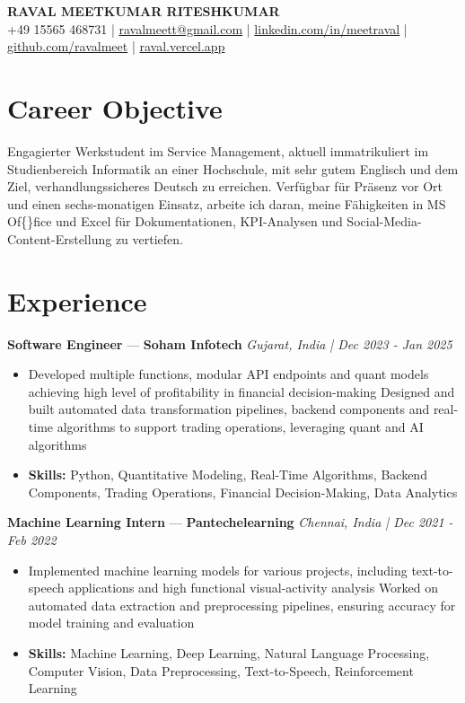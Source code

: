 \documentclass[a4paper,10pt]{article}
\begin{document}
\begin{center}
  {\Large\bfseries RAVAL MEETKUMAR RITESHKUMAR}\\[2pt]
  {\small +49 15565 468731 \;|\; \href{mailto:ravalmeett@gmail.com}{ravalmeett@gmail.com} \;|\; \href{https://www.linkedin.com/in/meetraval/}{linkedin.com/in/meetraval} \;|\; \href{https://github.com/ravalmeet}{github.com/ravalmeet} \;|\; \href{https://raval.vercel.app/}{raval.vercel.app}}
\end{center}
\vspace{-3pt}

\section*{Career Objective}
Engagierter Werkstudent im Service Management, aktuell immatrikuliert im Studienbereich Informatik an einer Hochschule, mit sehr gutem Englisch und dem Ziel, verhandlungssicheres Deutsch zu erreichen. Verfügbar für Präsenz vor Ort und einen sechs-monatigen Einsatz, arbeite ich daran, meine Fähigkeiten in MS Of\{\}fice und Excel für Dokumentationen, KPI-Analysen und Social-Media-Content-Erstellung zu vertiefen.\par

\section*{Experience}
\textbf{Software Engineer} — \textbf{Soham Infotech} \hfill \textit{Gujarat, India \;|\; Dec 2023 - Jan 2025}\par
\vspace{1pt}
\begin{itemize}
  \item Developed multiple functions, modular API endpoints and quant models achieving high level of profitability in financial decision-making Designed and built automated data transformation pipelines, backend components and real-time algorithms to support trading operations, leveraging quant and AI algorithms
  \item \textbf{Skills:} Python, Quantitative Modeling, Real-Time Algorithms, Backend Components, Trading Operations, Financial Decision-Making, Data Analytics
\end{itemize}
\vspace{3pt}
\textbf{Machine Learning Intern} — \textbf{Pantechelearning} \hfill \textit{Chennai, India \;|\; Dec 2021 - Feb 2022}\par
\vspace{1pt}
\begin{itemize}
  \item Implemented machine learning models for various projects, including text-to-speech applications and high functional visual-activity analysis Worked on automated data extraction and preprocessing pipelines, ensuring accuracy for model training and evaluation
  \item \textbf{Skills:} Machine Learning, Deep Learning, Natural Language Processing, Computer Vision, Data Preprocessing, Text-to-Speech, Reinforcement Learning
\end{itemize}
\end{document}
